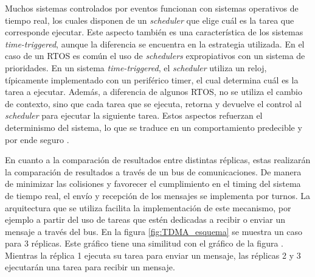 Muchos sistemas controlados por eventos funcionan con sistemas operativos de tiempo real, los cuales disponen de un \textit{scheduler} que elige cuál es la tarea que corresponde ejecutar. Este aspecto también es una característica de los sistemas \textit{time-triggered}, aunque la diferencia se encuentra en la estrategia utilizada. En el caso de un RTOS es común el uso de \textit{schedulers} expropiativos con un sistema de prioridades. En un sistema \textit{time-triggered}, el \textit{scheduler} utiliza un reloj, típicamente implementado con un periférico timer, el cual determina cuál es la tarea a ejecutar. Además, a diferencia de algunos RTOS, no se utiliza el cambio de contexto, sino que cada tarea que se ejecuta, retorna y devuelve el control al \textit{scheduler} para ejecutar la siguiente tarea. Estos aspectos refuerzan el determinismo del sistema, lo que se traduce en un comportamiento predecible y por ende seguro \cite[p.~247]{pont2008patterns}.






En cuanto a la comparación de resultados entre distintas réplicas, estas realizarán la comparación de resultados a través de un bus de comunicaciones. %
De manera de minimizar las colisiones y favorecer el cumplimiento en el timing del sistema de tiempo real, el envío y recepción de los mensajes se implementa por turnos. La arquitectura que se utiliza facilita la implementación de este mecanismo, por ejemplo a partir del uso de tareas que estén dedicadas a recibir o enviar un mensaje a través del bus. %
En la figura \ref{fig:TDMA_esquema} se muestra un caso para 3 réplicas. Este gráfico tiene una similitud con el gráfico de la figura . Mientras la réplica 1 ejecuta su tarea para enviar un mensaje, las réplicas 2 y 3 ejecutarán una tarea para recibir un mensaje.

